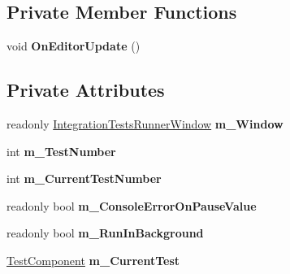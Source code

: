 \subsection*{Private Member Functions}
\begin{DoxyCompactItemize}
\item 
\mbox{\label{class_unity_test_1_1_integration_tests_runner_window_1_1_runner_callback_a46946ec1417ee0085b271954b6d5ff3b}} 
void {\bfseries On\+Editor\+Update} ()
\end{DoxyCompactItemize}
\subsection*{Private Attributes}
\begin{DoxyCompactItemize}
\item 
\mbox{\label{class_unity_test_1_1_integration_tests_runner_window_1_1_runner_callback_a50b1e7c7afa9693ad28bfb91cfa309db}} 
readonly \hyperlink{class_unity_test_1_1_integration_tests_runner_window}{Integration\+Tests\+Runner\+Window} {\bfseries m\+\_\+\+Window}
\item 
\mbox{\label{class_unity_test_1_1_integration_tests_runner_window_1_1_runner_callback_a93f9e852256a01158eefc5f9aa7a0818}} 
int {\bfseries m\+\_\+\+Test\+Number}
\item 
\mbox{\label{class_unity_test_1_1_integration_tests_runner_window_1_1_runner_callback_aa7ff6a834edaef941e19519592c1f23a}} 
int {\bfseries m\+\_\+\+Current\+Test\+Number}
\item 
\mbox{\label{class_unity_test_1_1_integration_tests_runner_window_1_1_runner_callback_ae036617b7fe1ad91ed8158b9dd1ab2f9}} 
readonly bool {\bfseries m\+\_\+\+Console\+Error\+On\+Pause\+Value}
\item 
\mbox{\label{class_unity_test_1_1_integration_tests_runner_window_1_1_runner_callback_a9c735bf1f98181483f19c40ef732d494}} 
readonly bool {\bfseries m\+\_\+\+Run\+In\+Background}
\item 
\mbox{\label{class_unity_test_1_1_integration_tests_runner_window_1_1_runner_callback_aceb7c193325b4e117631928bd6a3f0d1}} 
\hyperlink{class_unity_test_1_1_test_component}{Test\+Component} {\bfseries m\+\_\+\+Current\+Test}
\end{DoxyCompactItemize}


